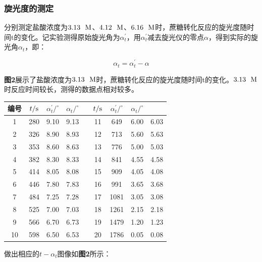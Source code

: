 \documentclass[12pt]{article}
\begin{document}
	 		\subsubsection{旋光度的测定}
			分别测定盐酸浓度为$3.13\ \ {\rm M}$、$4.12\ \ {\rm M}$、$6.16\ \ {\rm M}$时，蔗糖转化反应的旋光度随时间t的变化。记实验测得原始旋光角为$\alpha^{\prime}_{t}$，用$\alpha^{\prime}_{t}$减去旋光仪的零点$\alpha$，得到实际的旋光角$\alpha_{t}$，即：\par
			$$
			\alpha_{t}=\alpha^{\prime}_{t}-\alpha
			$$
			\par
			\textbf{图2}展示了盐酸浓度为$3.13\ \ {\rm M}$时，蔗糖转化反应的旋光度随时间t的变化。$3.13\ \ {\rm M}$时反应时间较长，测得的数据点相对较多。\par
			\begin{table}[!h]
				\centering
				\begin{tabular}{ccccccccc}
					\toprule
					编号 & $t/{\rm s}$ & $\alpha^{\prime}_{t}/^{\circ}$ & $\alpha_{t}/^{\circ}$&& $t/{\rm s}$ & $\alpha^{\prime}_{t}/^{\circ}$ & $\alpha_{t}/^{\circ}$\\
					\midrule
					1  & 280 & 9.10 & 9.13 &  & 11 & 649  & 6.00 & 6.03 \\
					2  & 326 & 8.90 & 8.93 &  & 12 & 713  & 5.60 & 5.63 \\
					3  & 353 & 8.60 & 8.63 &  & 13 & 776  & 5.00 & 5.03 \\
					4  & 382 & 8.30 & 8.33 &  & 14 & 841  & 4.55 & 4.58 \\
					5  & 414 & 8.05 & 8.08 &  & 15 & 909  & 4.05 & 4.08 \\
					6  & 446 & 7.80 & 7.83 &  & 16 & 991  & 3.65 & 3.68 \\
					7  & 484 & 7.25 & 7.28 &  & 17 & 1081 & 3.05 & 3.08 \\
					8  & 525 & 7.00 & 7.03 &  & 18 & 1261 & 2.15 & 2.18 \\
					9  & 566 & 6.70 & 6.73 &  & 19 & 1479 & 1.20 & 1.23 \\
					10 & 598 & 6.50 & 6.53 &  & 20 & 1786 & 0.05 & 0.08 \\
					\bottomrule
				\end{tabular}
			\end{table}
			做出相应的$t-\alpha_{t}$图像如\textbf{图2}所示：
\end{document}
